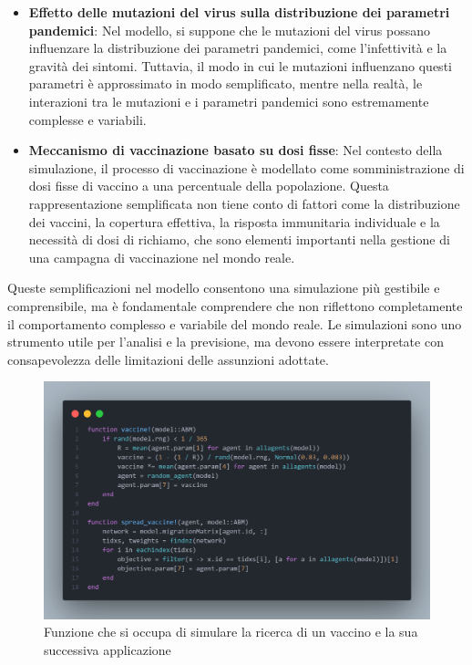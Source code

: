 \begin{itemize}
	\item \textbf{Effetto delle mutazioni del virus sulla distribuzione
	dei parametri pandemici}: Nel modello, si suppone che le mutazioni 
	del virus possano influenzare la distribuzione dei parametri 
	pandemici, come l'infettività e la gravità dei sintomi. 
	Tuttavia, il modo in cui le mutazioni influenzano questi parametri 
	è approssimato in modo semplificato, mentre nella realtà, 
	le interazioni tra le mutazioni e i parametri pandemici sono 
	estremamente complesse e variabili.
	\item \textbf{Meccanismo di vaccinazione basato su dosi fisse}: Nel 
	contesto della simulazione, il processo di vaccinazione è modellato 
	come somministrazione di dosi fisse di vaccino a una percentuale 
	della popolazione. Questa rappresentazione semplificata non tiene 
	conto di fattori come la distribuzione dei vaccini, la copertura 
	effettiva, la risposta immunitaria individuale e la necessità di 
	dosi di richiamo, che sono elementi importanti nella gestione di 
	una campagna di vaccinazione nel mondo reale.
\end{itemize}

Queste semplificazioni nel modello consentono una simulazione più 
gestibile e comprensibile, ma è fondamentale comprendere che non 
riflettono completamente il comportamento complesso e variabile 
del mondo reale. Le simulazioni sono uno strumento utile per l'analisi 
e la previsione, ma devono essere interpretate con consapevolezza delle 
limitazioni delle assunzioni adottate.

\begin{figure}[H]
    \begin{center}
		\includegraphics[width=\textwidth]{img/vaccine.png}
		\caption{Funzione che si occupa di simulare la ricerca di un vaccino e la sua successiva applicazione}
		\label{fig:vaccine}
	\end{center}
\end{figure}
